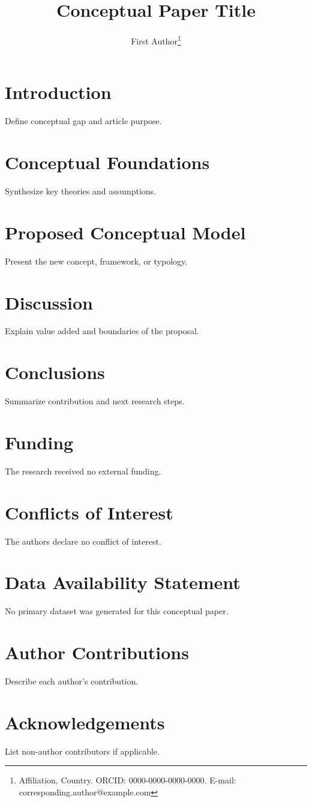 \documentclass[12pt,a4paper]{article}
\title{Conceptual Paper Title}
\author{First Author\footnote{Affiliation, Country. ORCID: 0000-0000-0000-0000. E-mail: corresponding.author@example.com}}
\date{}
\begin{document}
\maketitle

\begin{sdqabstract}
\end{sdqabstract}


\section{Introduction}
Define conceptual gap and article purpose.

\section{Conceptual Foundations}
Synthesize key theories and assumptions.

\section{Proposed Conceptual Model}
Present the new concept, framework, or typology.

\section{Discussion}
Explain value added and boundaries of the proposal.

\section{Conclusions}
Summarize contribution and next research steps.

\section*{Funding}
The research received no external funding.

\section*{Conflicts of Interest}
The authors declare no conflict of interest.

\section*{Data Availability Statement}
No primary dataset was generated for this conceptual paper.

\section*{Author Contributions}
Describe each author's contribution.

\section*{Acknowledgements}
List non-author contributors if applicable.

\printbibliography[title={References}]
\end{document}
